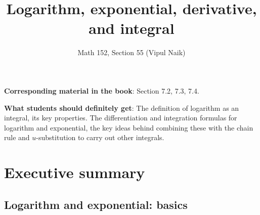 \documentclass[10pt]{amsart}
\title{Logarithm, exponential, derivative, and integral}
\author{Math 152, Section 55 (Vipul Naik)}
\begin{document}
\maketitle

{\bf Corresponding material in the book}: Section 7.2, 7.3, 7.4.

{\bf What students should definitely get}: The definition of logarithm
as an integral, its key properties. The differentiation and
integration formulas for logarithm and exponential, the key ideas
behind combining these with the chain rule and $u$-substitution to
carry out other integrals.

\section*{Executive summary}

\subsection{Logarithm and exponential: basics}
\end{document}
